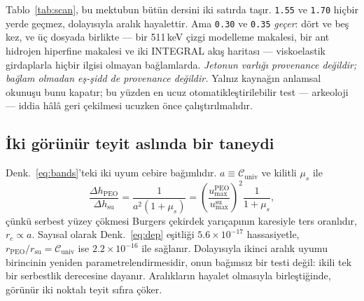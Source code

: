 \documentclass[11pt,a4paper]{article}
\begin{document}
Tablo~\ref{tab:scan}, bu mektubun bütün dersini iki satırda taşır.
\texttt{1.55} ve \texttt{1.70} hiçbir yerde geçmez, dolayısıyla aralık
hayalettir. Ama \texttt{0.30} ve \texttt{0.35} \emph{geçer}: dört ve beş
kez, ve üç dosyada birlikte --- bir 511\,keV çizgi modelleme makalesi, bir
ant hidrojen hiperfine makalesi ve iki INTEGRAL akış haritası --- viskoelastik
girdaplarla hiçbir ilgisi olmayan bağlamlarda. \emph{Jetonun varlığı
provenance değildir; bağlam olmadan eş-şidd de provenance değildir.} Yalnız
kaynağın anlamsal okunuşu bunu kapatır; bu yüzden en ucuz otomatikleştirilebilir
test --- arkeoloji --- iddia hâlâ geri çekilmesi ucuzken önce çalıştırılmalıdır.

\subsection{İki görünür teyit aslında bir taneydi}
Denk.~\eqref{eq:bands}'teki iki uyum cebire bağımlıdır. $a \equiv
\mathcal{C}_{\mathrm{univ}}$ ve kilitli $\mu_s$ ile
\begin{equation}
\label{eq:dep}
\frac{\Delta h_{\mathrm{PEO}}}{\Delta h_{\mathrm{su}}}
= \frac{1}{a^{2}(1+\mu_s)}
= \left(\frac{u_{\max}^{\mathrm{PEO}}}{u_{\max}^{\mathrm{su}}}\right)^{2}
\frac{1}{1+\mu_s},
\end{equation}
çünkü serbest yüzey çökmesi Burgers çekirdek yarıçapının karesiyle ters
oranlıdır, $r_c \propto a$. Sayısal olarak Denk.~\eqref{eq:dep} eşitliği
$5.6\times10^{-17}$ hassasiyetle, $r_{\mathrm{PEO}}/r_{\mathrm{su}} =
\mathcal{C}_{\mathrm{univ}}$ ise $2.2\times10^{-16}$ ile sağlanır. Dolayısıyla
ikinci aralık uyumu birincinin yeniden parametrelendirmesidir, onun bağımsız
bir testi değil: ikili tek bir serbestlik derecesine dayanır. Aralıkların
hayalet olmasıyla birleştiğinde, görünür iki noktalı teyit sıfıra çöker.
\end{document}
